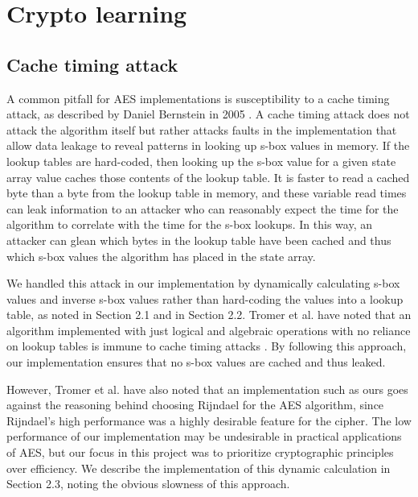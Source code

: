 \documentclass[a4paper,12pt]{article}
\begin{document}
\section{Crypto learning}

\subsection{Cache timing attack}
A common pitfall for AES implementations is susceptibility to a cache timing attack, as described by Daniel Bernstein in 2005 \cite{cache}. A cache timing attack does not attack the algorithm itself but rather attacks faults in the implementation that allow data leakage to reveal patterns in looking up s-box values in memory. If the lookup tables are hard-coded, then looking up the s-box value for a given state array value caches those contents of the lookup table. It is faster to read a cached byte than a byte from the lookup table in memory, and these variable read times can leak information to an attacker who can reasonably expect the time for the algorithm to correlate with the time for the s-box lookups. In this way, an attacker can glean which bytes in the lookup table have been cached and thus which s-box values the algorithm has placed in the state array.

We handled this attack in our implementation by dynamically calculating s-box values and inverse s-box values rather than hard-coding the values into a lookup table, as noted in Section 2.1 and in Section 2.2. Tromer et al. have noted that an algorithm implemented with just logical and algebraic operations with no reliance on lookup tables is immune to cache timing attacks \cite{Tromer}. By following this approach, our implementation ensures that no s-box values are cached and thus leaked.

However, Tromer et al. have also noted that an implementation such as ours goes against the reasoning behind choosing Rijndael for the AES algorithm, since Rijndael's high performance was a highly desirable feature for the cipher. The low performance of our implementation may be undesirable in practical applications of AES, but our focus in this project was to prioritize cryptographic principles over efficiency. We describe the implementation of this dynamic calculation in Section 2.3, noting the obvious slowness of this approach.
\end{document}
